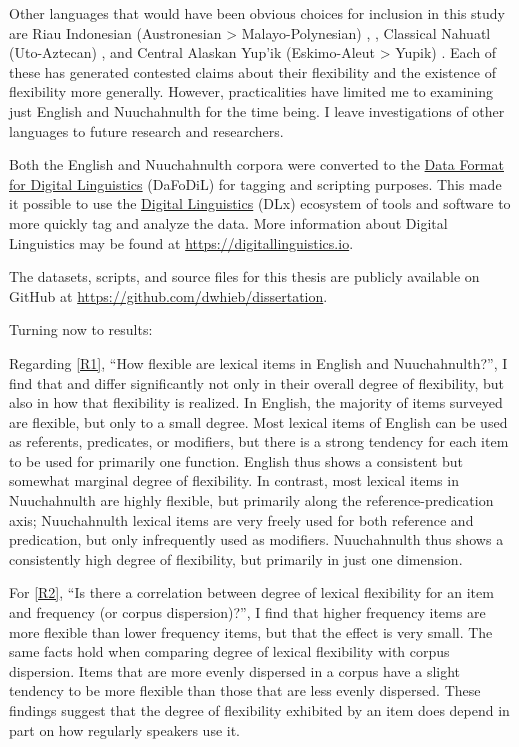 Other languages that would have been obvious choices for inclusion in this study are Riau Indonesian (Austronesian > Malayo-Polynesian) \parencite{Gil1994},  \parencites{EvansOsada2005}{HengeveldRijkhoff2005}, Classical Nahuatl (Uto-Aztecan) \parencites{Launey1994}{Launey2004}, and Central Alaskan Yup'ik (Eskimo-Aleut > Yupik) \parencites{Thalbitzer1922}{Sadock1999}{Mithun2017}. Each of these has generated contested claims about their flexibility and the existence of flexibility more generally. However, practicalities have limited me to examining just English and Nuuchahnulth for the time being. I leave investigations of other languages to future research and researchers.

Both the English and Nuuchahnulth corpora were converted to the \href{https://format.digitallinguistics.io}{Data Format for Digital Linguistics} (DaFoDiL)  for tagging and scripting purposes. This made it possible to use the \href{https://digitallinguistics.io}{Digital Linguistics} (DLx) ecosystem of tools and software to more quickly tag and analyze the data. More information about Digital Linguistics may be found at \url{https://digitallinguistics.io}.

The datasets, scripts, and source files for this thesis are publicly available on GitHub at \url{https://github.com/dwhieb/dissertation}.

Turning now to results:

Regarding \ref{R1}, \enquote{How flexible are lexical items in English and Nuuchahnulth?}, I find that  and  differ significantly not only in their overall degree of flexibility, but also in how that flexibility is realized. In English, the majority of items surveyed are flexible, but only to a small degree. Most lexical items of English can be used as referents, predicates, or modifiers, but there is a strong tendency for each item to be used for primarily one function. English thus shows a consistent but somewhat marginal degree of flexibility. In contrast, most lexical items in Nuuchahnulth are highly flexible, but primarily along the reference-predication axis; Nuuchahnulth lexical items are very freely used for both reference and predication, but only infrequently used as modifiers. Nuuchahnulth thus shows a consistently high degree of flexibility, but primarily in just one dimension.

For \ref{R2}, \enquote{Is there a correlation between degree of lexical flexibility for an item and frequency (or corpus dispersion)?}, I find that higher frequency items are more flexible than lower frequency items, but that the effect is very small. The same facts hold when comparing degree of lexical flexibility with corpus dispersion. Items that are more evenly dispersed in a corpus have a slight tendency to be more flexible than those that are less evenly dispersed. These findings suggest that the degree of flexibility exhibited by an item does depend in part on how regularly speakers use it.

